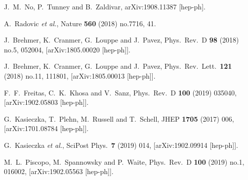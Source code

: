\documentclass[prd,aps,letterpaper,floatfix,superscriptaddress,preprintnumbers,twocolumn,10pt,nofootinbib]{revtex4-1}
\begin{document}
\begin{thebibliography}{99}


  J.~M.~No, P.~Tunney and B.~Zaldivar,
  arXiv:1908.11387 [hep-ph].  
  
  

  A.~Radovic {\it et al.},
  Nature {\bf 560} (2018) no.7716,  41.





  J.~Brehmer, K.~Cranmer, G.~Louppe and J.~Pavez,
  Phys.\ Rev.\ D {\bf 98} (2018) no.5,  052004,
  [arXiv:1805.00020 [hep-ph]].
  
  J.~Brehmer, K.~Cranmer, G.~Louppe and J.~Pavez,
  Phys.\ Rev.\ Lett.\  {\bf 121} (2018) no.11,  111801,
  [arXiv:1805.00013 [hep-ph]].  



  F.~F.~Freitas, C.~K.~Khosa and V.~Sanz,
  Phys.\ Rev.\ D {\bf 100} (2019) 035040,
  [arXiv:1902.05803 [hep-ph]].



  G.~Kasieczka, T.~Plehn, M.~Russell and T.~Schell,
  JHEP {\bf 1705} (2017) 006,
  [arXiv:1701.08784 [hep-ph]].

  G.~Kasieczka {\it et al.},
  SciPost Phys.\  {\bf 7} (2019) 014,
  [arXiv:1902.09914 [hep-ph]]. 


  M.~L.~Piscopo, M.~Spannowsky and P.~Waite,
  Phys.\ Rev.\ D {\bf 100} (2019) no.1,  016002,
  [arXiv:1902.05563 [hep-ph]].



\end{thebibliography}
\end{document}
